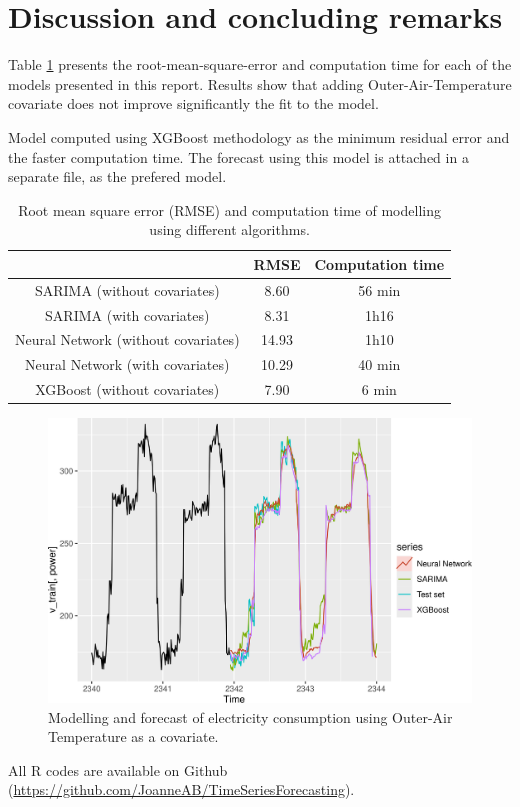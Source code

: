 \section{Discussion and concluding remarks}
Table \ref{table_discussion} presents the root-mean-square-error and computation time for each of 
the models presented in this report. Results show that adding Outer-Air-Temperature covariate does 
not improve significantly the fit to the model.

Model computed using XGBoost methodology as the minimum residual error and the faster computation 
time. The forecast using this model is attached in a separate file, as the prefered model.

\begin{table}[H]
\centering \begin{tabular}{c|cc}
                                    & RMSE & Computation time\\\hline\hline
SARIMA (without covariates)         &  8.60 &  56 min \\
SARIMA (with covariates)            &  8.31 &  1h16   \\
Neural Network (without covariates) & 14.93 &  1h10   \\
Neural Network (with covariates)    & 10.29 &  40 min \\
XGBoost (without covariates)        & 7.90  &  6 min
\end{tabular}
\caption{Root mean square error (RMSE) and computation time of modelling using different algorithms.}
\label{table_discussion}
\end{table}

\begin{figure}[!h]
\centering
 \includegraphics[scale=0.6]{figures/figure_discussion.png}
\caption{Modelling and forecast of electricity consumption using Outer-Air Temperature as a covariate.}
\label{figure_discussion}
\end{figure}

All R codes are available on Github (\url{https://github.com/JoanneAB/TimeSeriesForecasting}).

